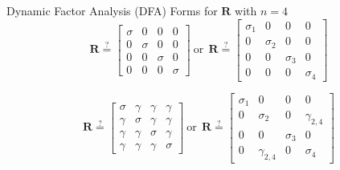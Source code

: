 \documentclass[
  ignorenonframetext,
]{beamer}
\begin{document}
\begin{frame}{Dynamic Factor Analysis (DFA) \textbar{} Forms for
\(\mathbf{R}\) with \(n = 4\)}
\protect\hypertarget{dynamic-factor-analysis-dfa-forms-for-mathbfr-with-n-4}{}
\[
\mathbf{R} \stackrel{?}{=}
\begin{bmatrix}
 \sigma & 0 & 0 & 0 \\
 0 & \sigma & 0 & 0 \\
 0 & 0 & \sigma & 0 \\
 0 & 0 & 0 & \sigma
\end{bmatrix}
~\text{or}~~
\mathbf{R} \stackrel{?}{=}
\begin{bmatrix}
 \sigma_1 & 0 & 0 & 0 \\
 0 & \sigma_2 & 0 & 0 \\
 0 & 0 & \sigma_3 & 0 \\
 0 & 0 & 0 & \sigma_4
\end{bmatrix}
\]

\[
\mathbf{R} \stackrel{?}{=}
\begin{bmatrix}
 \sigma & \gamma & \gamma & \gamma \\
 \gamma & \sigma & \gamma & \gamma \\
 \gamma & \gamma & \sigma & \gamma \\
 \gamma & \gamma & \gamma & \sigma
\end{bmatrix}
~\text{or}~~
\mathbf{R} \stackrel{?}{=}
\begin{bmatrix}
 \sigma_1 & 0 & 0 & 0 \\
 0 & \sigma_2 & 0 & \gamma_{2,4} \\
 0 & 0 & \sigma_3 & 0 \\
 0 & \gamma_{2,4} & 0 & \sigma_4
\end{bmatrix}
\]
\end{frame}
\end{document}
